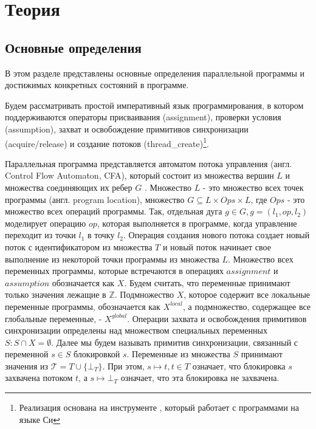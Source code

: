\newcommand{\epp}{\mathrel{\bigoplus}}

\chapter{Теория}
\label{chapter_theory}

\section{Основные определения}
В этом разделе представлены основные определения параллельной программы и достижимых конкретных состояний в программе.

Будем рассматривать простой императивный язык программирования, в котором поддерживаются операторы присваивания (assignment), проверки условия (assumption), захват и освобождение примитивов синхронизации (acquire/release) и создание потоков (thread\_create)\footnote{Реализация основана на инструменте \cpachecker, который работает с программами на языке Си}.

Параллельная программа представляется автоматом потока управления (англ. Control Flow Automaton, CFA), который состоит из множества вершин $L$  и множества соединяющих их ребер $G$ .
Множество $L$ - это множество всех точек программы (англ. program location), множество $G \subseteq L \times Ops \times L$, где $Ops$ - это множество всех операций программы.
Так, отдельная дуга $g \in G, g = (l_1, op, l_2)$ моделирует операцию $op$, которая выполняется в программе, когда управление переходит из точки $l_1$ в точку $l_2$.
Операция создания нового потока создает новый поток с идентификатором из множества $T$ и новый поток начинает свое выполнение из некоторой точки программы из множества $L$.
Множество всех переменных программы, которые встречаются в операциях $assignment$ и $assumption$ обозначается как $X$.
Будем считать, что переменные принимают только значения лежащие в $\mathbb{Z}$.
Подмножество $X$, которое содержит все локальные переменные программы, обозначается как $X^{local}$, а подмножество, содержащее все глобальные переменные, -  $X^{global}$. 
Операции захвата и освобождения примитивов синхронизации определены над множеством специальных переменных $S: S \cap X = \emptyset$.
Далее мы будем называть примитив синхронизации, связанный с переменной $s \in S$ блокировкой $s$.
Переменные из множества $S$ принимают значения из $\mathcal{T}=T \cup \{\bot_T\}$.
При этом, $s \mapsto t, t \in T$ означает, что блокировка $s$ захвачена потоком $t$, а $s \mapsto \bot_T$ означает, что эта блокировка не захвачена.

